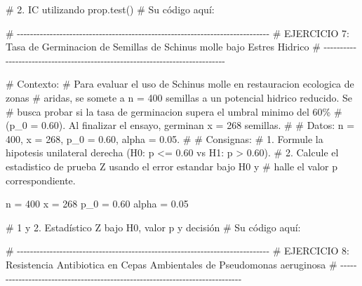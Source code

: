 \documentclass[
  spanish,
  letterpaper,
  DIV=11,
  numbers=noendperiod]{scrreprt}
\newenvironment{Shaded}{\begin{snugshade}}{\end{snugshade}}
\newcommand{\CommentTok}[1]{\textcolor[rgb]{0.37,0.37,0.37}{#1}}
\newcommand{\DecValTok}[1]{\textcolor[rgb]{0.68,0.00,0.00}{#1}}
\newcommand{\FloatTok}[1]{\textcolor[rgb]{0.68,0.00,0.00}{#1}}
\newcommand{\NormalTok}[1]{\textcolor[rgb]{0.00,0.23,0.31}{#1}}
\newcommand{\OtherTok}[1]{\textcolor[rgb]{0.00,0.23,0.31}{#1}}
\begin{document}
\begin{Shaded}
\begin{Highlighting}[]
\CommentTok{\# 2. IC utilizando prop.test()}
\CommentTok{\# Su código aquí:}



\CommentTok{\# {-}{-}{-}{-}{-}{-}{-}{-}{-}{-}{-}{-}{-}{-}{-}{-}{-}{-}{-}{-}{-}{-}{-}{-}{-}{-}{-}{-}{-}{-}{-}{-}{-}{-}{-}{-}{-}{-}{-}{-}{-}{-}{-}{-}{-}{-}{-}{-}{-}{-}{-}{-}{-}{-}{-}{-}{-}{-}{-}{-}{-}{-}{-}{-}{-}{-}{-}{-}{-}{-}{-}{-}{-}{-}{-}{-}{-}}
\CommentTok{\# EJERCICIO 7: Tasa de Germinacion de Semillas de Schinus molle bajo Estres Hidrico}
\CommentTok{\# {-}{-}{-}{-}{-}{-}{-}{-}{-}{-}{-}{-}{-}{-}{-}{-}{-}{-}{-}{-}{-}{-}{-}{-}{-}{-}{-}{-}{-}{-}{-}{-}{-}{-}{-}{-}{-}{-}{-}{-}{-}{-}{-}{-}{-}{-}{-}{-}{-}{-}{-}{-}{-}{-}{-}{-}{-}{-}{-}{-}{-}{-}{-}{-}{-}{-}{-}{-}{-}{-}{-}{-}{-}{-}{-}{-}{-}}

\CommentTok{\# Contexto:}
\CommentTok{\# Para evaluar el uso de Schinus molle en restauracion ecologica de zonas}
\CommentTok{\# aridas, se somete a n = 400 semillas a un potencial hidrico reducido. Se}
\CommentTok{\# busca probar si la tasa de germinacion supera el umbral minimo del 60\%}
\CommentTok{\# (p\_0 = 0.60). Al finalizar el ensayo, germinan x = 268 semillas.}
\CommentTok{\#}
\CommentTok{\# Datos: n = 400, x = 268, p\_0 = 0.60, alpha = 0.05.}
\CommentTok{\#}
\CommentTok{\# Consignas:}
\CommentTok{\# 1. Formule la hipotesis unilateral derecha (H0: p \textless{}= 0.60 vs H1: p \textgreater{} 0.60).}
\CommentTok{\# 2. Calcule el estadistico de prueba Z usando el error estandar bajo H0 y}
\CommentTok{\#    halle el valor p correspondiente.}

\NormalTok{n }\OtherTok{=} \DecValTok{400}
\NormalTok{x }\OtherTok{=} \DecValTok{268}
\NormalTok{p\_0 }\OtherTok{=} \FloatTok{0.60}
\NormalTok{alpha }\OtherTok{=} \FloatTok{0.05}

\CommentTok{\# 1 y 2. Estadístico Z bajo H0, valor p y decisión}
\CommentTok{\# Su código aquí:}



\CommentTok{\# {-}{-}{-}{-}{-}{-}{-}{-}{-}{-}{-}{-}{-}{-}{-}{-}{-}{-}{-}{-}{-}{-}{-}{-}{-}{-}{-}{-}{-}{-}{-}{-}{-}{-}{-}{-}{-}{-}{-}{-}{-}{-}{-}{-}{-}{-}{-}{-}{-}{-}{-}{-}{-}{-}{-}{-}{-}{-}{-}{-}{-}{-}{-}{-}{-}{-}{-}{-}{-}{-}{-}{-}{-}{-}{-}{-}{-}}
\CommentTok{\# EJERCICIO 8: Resistencia Antibiotica en Cepas Ambientales de Pseudomonas aeruginosa}
\CommentTok{\# {-}{-}{-}{-}{-}{-}{-}{-}{-}{-}{-}{-}{-}{-}{-}{-}{-}{-}{-}{-}{-}{-}{-}{-}{-}{-}{-}{-}{-}{-}{-}{-}{-}{-}{-}{-}{-}{-}{-}{-}{-}{-}{-}{-}{-}{-}{-}{-}{-}{-}{-}{-}{-}{-}{-}{-}{-}{-}{-}{-}{-}{-}{-}{-}{-}{-}{-}{-}{-}{-}{-}{-}{-}{-}{-}{-}{-}}


\end{Highlighting}
\end{Shaded}
\end{document}
